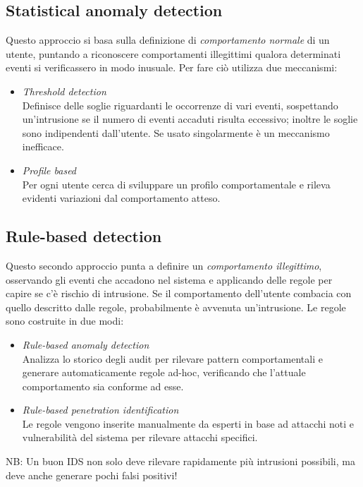\documentclass[a4paper, 11pt, twoside, openright, fleqn]{report}
\begin{document}
\subsection{Statistical anomaly detection}
Questo approccio si basa sulla definizione di \emph{comportamento normale} di un utente, puntando a riconoscere comportamenti illegittimi qualora determinati eventi si verificassero in modo inusuale.
Per fare ciò utilizza due meccanismi:
\begin{itemize}
	\item \emph{Threshold detection}\\
	Definisce delle soglie riguardanti le occorrenze di vari eventi, sospettando un'intrusione se il numero di eventi accaduti risulta eccessivo; inoltre le soglie sono indipendenti dall'utente. Se usato singolarmente è un meccanismo inefficace.
	\item \emph{Profile based}\\
	Per ogni utente cerca di sviluppare un profilo comportamentale e rileva evidenti variazioni dal comportamento atteso.
\end{itemize}

\subsection{Rule-based detection}
Questo secondo approccio punta a definire un \emph{comportamento illegittimo}, osservando gli eventi che accadono nel sistema e applicando delle regole per capire se c'è rischio di intrusione. Se il comportamento dell'utente combacia con quello descritto dalle regole, probabilmente è avvenuta un'intrusione. Le regole sono costruite in due modi:
\begin{itemize}
	\item \emph{Rule-based anomaly detection}\\
	Analizza lo storico degli audit per rilevare pattern comportamentali e generare automaticamente regole ad-hoc, verificando che l'attuale comportamento sia conforme ad esse.
	\item \emph{Rule-based penetration identification}\\
	Le regole vengono inserite manualmente da esperti in base ad attacchi noti e vulnerabilità del sistema per rilevare attacchi specifici.
\end{itemize}

\noindent
NB: Un buon IDS non solo deve rilevare rapidamente più intrusioni possibili, ma deve anche generare pochi falsi positivi! 
\end{document}

